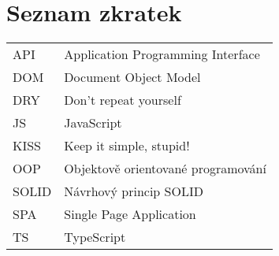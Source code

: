 \section*{Seznam zkratek}
\vspace{2em}

\noindent
\begin{tabular}{@{}ll@{}}
API	  &	Application Programming Interface\\
DOM	  &	Document Object Model\\
DRY	  &	Don't repeat yourself\\
JS    & JavaScript\\
KISS	&	Keep it simple, stupid!\\
OOP	  &	Objektově orientované programování\\
SOLID	&	Návrhový princip SOLID\\
SPA   & Single Page Application\\
TS    & TypeScript
\end{tabular}

